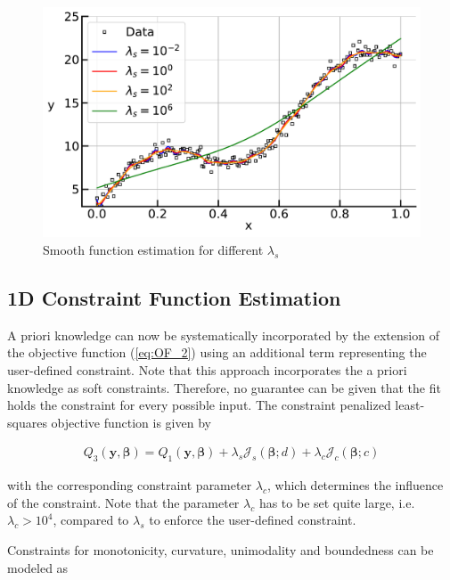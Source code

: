 \documentclass[10pt,a4paper]{article}
\begin{document}
	\begin{figure}[H]
		\centering
		\includegraphics[width=\linewidth]{../thesisplots/p_splines.pdf}
		\caption{Smooth function estimation for different $\lambda_s$}
		\label{fig:pspline}
	\end{figure}

	\subsection{1D Constraint Function Estimation}
	
	A priori knowledge can now be systematically incorporated by the extension of the objective function (\ref{eq:OF_2}) using an additional term representing the user-defined constraint. Note that this approach incorporates the a priori knowledge as soft constraints. Therefore, no guarantee can be given that the fit holds the constraint for every possible input. The constraint penalized least-squares objective function is given by
	
	\begin{align}\label{eq:OF_3}
		Q_3(\boldsymbol{y}, \boldsymbol{\beta}) = Q_1(\boldsymbol{y}, \boldsymbol{\beta}) + \lambda_s \mathcal{J}_s(\boldsymbol{\beta}; d) + \lambda_c \mathcal{J}_c(\boldsymbol{\beta}; c)
	\end{align}
	
	with the corresponding constraint parameter $\lambda_c$, which determines the influence of the constraint. Note that the parameter $\lambda_c$ has to be set quite large, i.e. $\lambda_c > 10^4$, compared to $\lambda_s$ to enforce the user-defined constraint. 
	
	Constraints for monotonicity, curvature, unimodality and boundedness can be modeled as 
	
\end{document}
